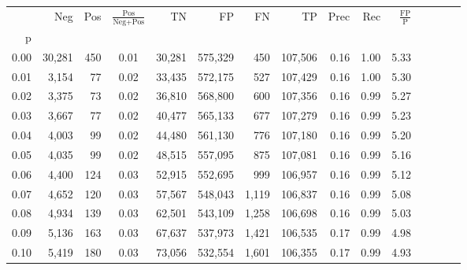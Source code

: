 \begin{tabular}{rrrcrrrrrrrrrrr}
\toprule
{} &     Neg &    Pos & $\frac{\text{Pos}}{\text{Neg}+\text{Pos}}$ &       TN &       FP &       FN &       TP &  Prec &   Rec & $\frac{\text{FP}}{\text{P}}$ \\
p    &         &        &                                            &          &          &          &          &       &       &                              \\
\midrule
0.00 &  30,281 &    450 &                                       0.01 &   30,281 &  575,329 &      450 &  107,506 &  0.16 &  1.00 &                         5.33 \\
0.01 &   3,154 &     77 &                                       0.02 &   33,435 &  572,175 &      527 &  107,429 &  0.16 &  1.00 &                         5.30 \\
0.02 &   3,375 &     73 &                                       0.02 &   36,810 &  568,800 &      600 &  107,356 &  0.16 &  0.99 &                         5.27 \\
0.03 &   3,667 &     77 &                                       0.02 &   40,477 &  565,133 &      677 &  107,279 &  0.16 &  0.99 &                         5.23 \\
0.04 &   4,003 &     99 &                                       0.02 &   44,480 &  561,130 &      776 &  107,180 &  0.16 &  0.99 &                         5.20 \\
0.05 &   4,035 &     99 &                                       0.02 &   48,515 &  557,095 &      875 &  107,081 &  0.16 &  0.99 &                         5.16 \\
0.06 &   4,400 &    124 &                                       0.03 &   52,915 &  552,695 &      999 &  106,957 &  0.16 &  0.99 &                         5.12 \\
0.07 &   4,652 &    120 &                                       0.03 &   57,567 &  548,043 &    1,119 &  106,837 &  0.16 &  0.99 &                         5.08 \\
0.08 &   4,934 &    139 &                                       0.03 &   62,501 &  543,109 &    1,258 &  106,698 &  0.16 &  0.99 &                         5.03 \\
0.09 &   5,136 &    163 &                                       0.03 &   67,637 &  537,973 &    1,421 &  106,535 &  0.17 &  0.99 &                         4.98 \\
0.10 &   5,419 &    180 &                                       0.03 &   73,056 &  532,554 &    1,601 &  106,355 &  0.17 &  0.99 &                         4.93 \\

\end{tabular}
